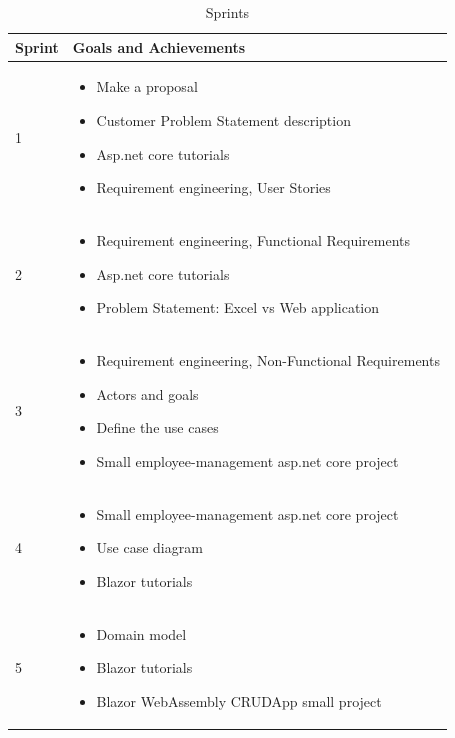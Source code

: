 \documentclass{scrartcl}
\begin{document}
\begin{table}[H]
\begin{center}
\begin{tabular}{| p{2.5cm}| p{12cm} |}
\hline
\rowcolor{LightCyan}
\textbf{Sprint} & \textbf{Goals and Achievements} \\
\hline

1                   &             
\begin{itemize}
\item Make a proposal
 \item Customer Problem Statement description
 \item Asp.net core tutorials
 \item Requirement engineering, User Stories


 \end{itemize}\\ \hline
 
2                &             
\begin{itemize}
 \item Requirement engineering, Functional Requirements 
 \item Asp.net core tutorials
 \item Problem Statement: Excel vs Web application


 \end{itemize}\\ \hline
 3                 &             
\begin{itemize}
\item Requirement engineering, Non-Functional Requirements
 \item Actors and goals
 \item Define the use cases
 \item Small employee-management asp.net core project


 \end{itemize}\\ \hline
 4                   &             
\begin{itemize}
 \item Small employee-management asp.net core project
 \item Use case diagram
 \item Blazor tutorials
\end{itemize}\\ \hline
 
  5              &             
\begin{itemize}
 \item Domain model
 \item Blazor tutorials
 \item Blazor WebAssembly CRUDApp small project


 \end{itemize}\\ \hline
 

 
 

 \end{tabular}
\end{center}
\caption{Sprints}
\label{table2}
\end{table}
\end{document}
